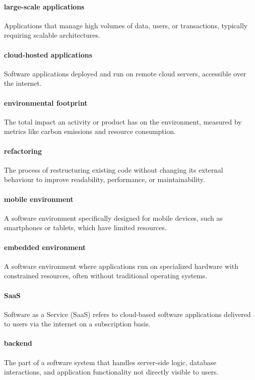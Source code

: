 \documentclass[12pt]{article}
\begin{document}
\paragraph*{large-scale applications}
Applications that manage high volumes of data, users, or transactions, typically requiring scalable architectures.

\paragraph*{cloud-hosted applications}
Software applications deployed and run on remote cloud servers, accessible over the internet.

\paragraph*{environmental footprint}
The total impact an activity or product has on the environment, measured by metrics like carbon emissions and resource consumption.

\paragraph*{refactoring}
The process of restructuring existing code without changing its external behaviour to improve readability, performance, or maintainability.

\paragraph*{mobile environment}
A software environment specifically designed for mobile devices, such as smartphones or tablets, which have limited resources.

\paragraph*{embedded environment}
A software environment where applications run on specialized hardware with constrained resources, often without traditional operating systems.

\paragraph*{SaaS}
Software as a Service (SaaS) refers to cloud-based software applications delivered to users via the internet on a subscription basis.

\paragraph*{backend}
The part of a software system that handles server-side logic, database interactions, and application functionality not directly visible to users.
\end{document}

